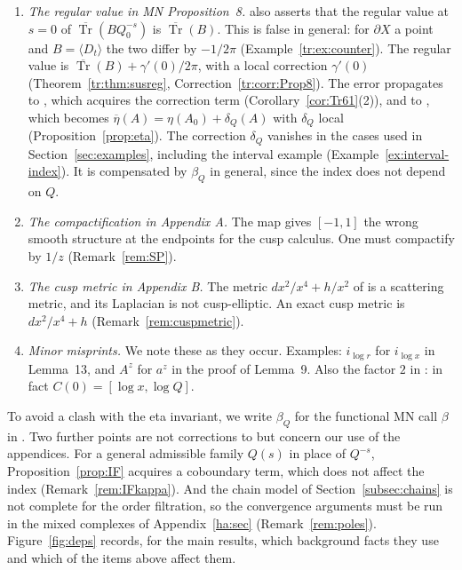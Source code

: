 \documentclass[11pt,oneside,reqno]{article}
\DeclareMathOperator{\Tr}{Tr}
\newcommand{\bTr}{\overline{\Tr}}
\newcommand{\lQ}{\log Q}
\newcommand{\lx}{\log x}
\newcommand{\etab}{\overline\eta}
\theoremstyle{plain}
\theoremstyle{definition}
\theoremstyle{remark}
\begin{document}
\begin{enumerate}
residue with \(\bTr([t,B])\) in \cite[Prop.~8]{MN} fails, for instance when
\(\partial X\) is a point (Remark~\ref{rem:Prop8}); a parity argument
of the same kind applies to \(Q_0^{-n}\) on any boundary. We use the residue
itself.
\item\label{item:Prop8reg} \emph{The regular value in MN Proposition~8.}
\cite[Prop.~8]{MN} also asserts that the regular value at \(s=0\) of
\(\bTr(BQ_0^{-s})\) is \(\bTr(B)\). This is false in general: for
\(\partial X\) a point and \(B=\langle D_t\rangle\) the two differ by
\(-1/2\pi\) (Example~\ref{tr:ex:counter}). The regular value is
\(\bTr(B)+\gamma'(0)/2\pi\), with a local correction \(\gamma'(0)\)
(Theorem~\ref{tr:thm:susreg}, Correction~\ref{tr:corr:Prop8}). The error
propagates to \cite[Cor.~2]{MN}, which acquires the correction term
(Corollary~\ref{cor:Tr61}(2)), and to \cite[Prop.~17]{MN}, which becomes
\(\etab(A)=\eta(A_0)+\delta_Q(A)\) with \(\delta_Q\) local
(Proposition~\ref{prop:eta}). The correction \(\delta_Q\) vanishes in the
cases used in Section~\ref{sec:examples}, including the interval example
(Example~\ref{ex:interval-index}). It is compensated by \(\beta_Q\) in
general, since the index does not depend on \(Q\).
\item \emph{The compactification in Appendix A.} The map
\cite[(130)]{MN} gives \([-1,1]\) the wrong smooth structure at the
endpoints for the cusp calculus. One must compactify by \(1/z\)
(Remark~\ref{rem:SP}).
\item \emph{The cusp metric in Appendix B.} The metric
\(dx^2/x^4+h/x^2\) of \cite[App.~B]{MN} is a scattering metric, and its
Laplacian is not cusp-elliptic. An exact cusp metric is
\(dx^2/x^4+h\) (Remark~\ref{rem:cuspmetric}).
\item \emph{Minor misprints.} We note these as they occur. Examples:
\(i_{\log r}\) for \(i_{\lx}\) in Lemma~13, and \(A^z\) for \(a^z\) in the
proof of Lemma~9. Also the factor \(2\) in \cite[(80)]{MN}: in fact
\(C(0)=[\lx,\lQ]\).
\end{enumerate}
To avoid a clash with the eta invariant, we write \(\beta_Q\) for the
functional MN call \(\beta\) in \cite[(91)]{MN}. Two further points are
not corrections to \cite{MN} but concern our use of the appendices. For a
general admissible family \(Q(s)\) in place of \(Q^{-s}\),
Proposition~\ref{prop:IF} acquires a coboundary term, which does not
affect the index (Remark~\ref{rem:IFkappa}). And the chain model of
Section~\ref{subsec:chains} is not complete for the order filtration, so
the convergence arguments must be run in the mixed complexes of
Appendix~\ref{ha:sec} (Remark~\ref{rem:poles}).
Figure~\ref{fig:deps} records, for the main results, which background
facts they use and which of the items above affect them.
\end{document}
